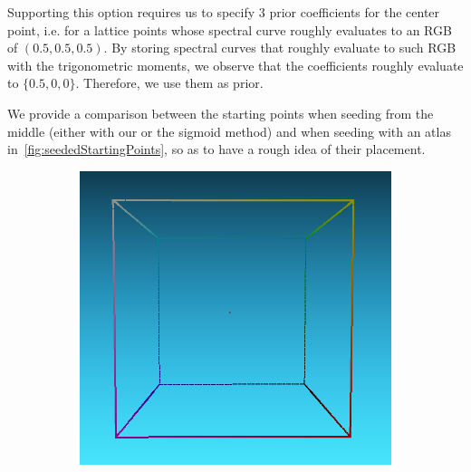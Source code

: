 Supporting this option requires us to specify 3 prior coefficients for the center point, i.e. for a lattice points whose spectral curve roughly evaluates to an RGB of $(0.5, 0.5, 0.5)$. By storing spectral curves that roughly evaluate to such RGB with the trigonometric moments, we observe that the coefficients roughly evaluate to $\{0.5, 0, 0\}$. Therefore, we use them as prior.

We provide a comparison between the starting points when seeding from the middle (either with our or the sigmoid method) and when seeding with an atlas in~\cref{fig:seededStartingPoints}, so as to have a rough idea of their placement.

\begin{figure}[t]
	\centering
	\captionsetup[subfigure]{font=footnotesize,labelfont=footnotesize}
	\captionsetup[subfigure]{justification=centering}
	\begin{subfigure}[t]{0.45\textwidth}
		\includegraphics[width=\linewidth]{img/seededStarting_sigmoid.png}
		\label{fig:seededStarting_sigmoid}
	\end{subfigure} \hspace{0.2em}
	\begin{subfigure}[t]{0.45\textwidth}

\end{subfigure}
\end{figure}
